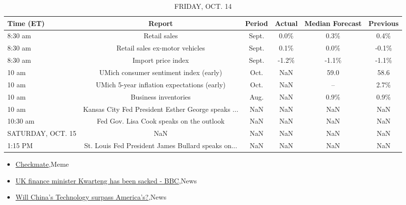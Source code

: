\documentclass{article}%
\begin{document}
%


\begin{table}[htbp]%
\caption{FRIDAY, OCT. 14}%
\centering%
\begin{adjustbox}{width=1\textwidth}%
\begin{tabular}{lccccc}
\toprule
        Time (ET) &                                             Report & Period & Actual & Median Forecast & Previous \\
\midrule
          8:30 am &                                       Retail sales &  Sept. &   0.0\% &            0.3\% &     0.4\% \\
          8:30 am &                     Retail sales ex-motor vehicles &  Sept. &   0.1\% &            0.0\% &    -0.1\% \\
          8:30 am &                                 Import price index &  Sept. &  -1.2\% &           -1.1\% &    -1.1\% \\
            10 am &             UMich consumer sentiment index (early) &   Oct. &    NaN &            59.0 &     58.6 \\
            10 am &        UMich 5-year inflation expectations (early) &   Oct. &    NaN &              -- &     2.7\% \\
            10 am &                               Business inventories &   Aug. &    NaN &            0.9\% &     0.9\% \\
            10 am & Kansas City Fed President Esther George speaks ... &    NaN &    NaN &             NaN &      NaN \\
         10:30 am &           Fed Gov. Lisa Cook speaks on the outlook &    NaN &    NaN &             NaN &      NaN \\
SATURDAY, OCT. 15 &                                                NaN &    NaN &    NaN &             NaN &      NaN \\
          1:15 PM & St. Louis Fed President James Bullard speaks on... &    NaN &    NaN &             NaN &      NaN \\
\bottomrule
\end{tabular}
%
\end{adjustbox}%
\end{table}

%
\begin{itemize}%
\item%
\href{https://reddit.com/r/wallstreetbets/comments/y3t3i0/checkmate/}{Checkmate},Meme%
\item%
\href{https://reddit.com/r/Economics/comments/y3rmwf/uk\_finance\_minister\_kwarteng\_has\_been\_sacked\_bbc/}{UK finance minister Kwarteng has been sacked - BBC},News%
\item%
\href{https://reddit.com/r/Economics/comments/y3msmj/will\_chinas\_technology\_surpass\_americas/}{Will China's Technology surpass America's?},News%
\end{itemize}%
\end{document}

